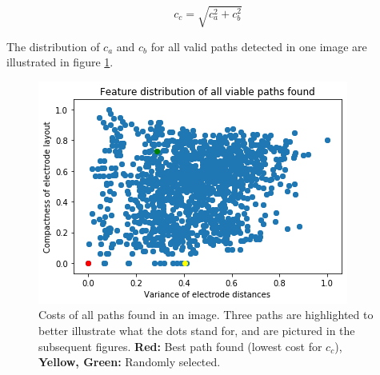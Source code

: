 \documentclass[a4paper, 11pt]{article}
\begin{document}
$$c_{c} = \sqrt{c_a^2+c_b^2}$$

The distribution of $c_a$ and $c_b$ for all valid paths detected in one image are illustrated in figure \ref{feature_distribution}.

\begin{figure}[ht]
	\centering
  \includegraphics[width=.5\textwidth]{feature_distribution.png}
	\caption{Costs of all paths found in an image. Three paths are highlighted to better illustrate what the dots stand for, and are pictured in the subsequent figures. \textbf{Red:} Best path found (lowest cost for $c_c$), \textbf{Yellow, Green:} Randomly selected.}
	\label{feature_distribution}
\end{figure}
\end{document}
